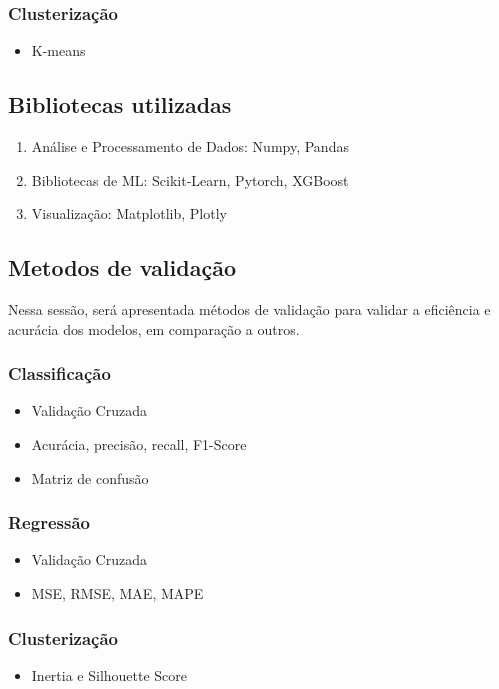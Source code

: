 \documentclass[a4paper,12pt]{article}
\begin{document}
\subsubsection{Clusterização}
\begin{itemize}
    \item K-means
\end{itemize}
\subsection{Bibliotecas utilizadas}

\begin{enumerate}
    \item Análise e Processamento de Dados: Numpy, Pandas
    \item Bibliotecas de ML: Scikit-Learn, Pytorch, XGBoost
    \item Visualização: Matplotlib, Plotly
\end{enumerate}

\subsection{Metodos de validação}

Nessa sessão, será apresentada métodos de validação para validar a eficiência e acurácia dos modelos, em comparação a outros.

\subsubsection{Classificação}
\begin{itemize}
    \item Validação Cruzada
    \item Acurácia, precisão, recall, F1-Score
    \item Matriz de confusão
\end{itemize}
\subsubsection{Regressão}
\begin{itemize}
    \item Validação Cruzada
    \item MSE, RMSE, MAE, MAPE
\end{itemize}
\subsubsection{Clusterização}
\begin{itemize}
    \item Inertia e Silhouette Score
\end{itemize}
\end{document}
